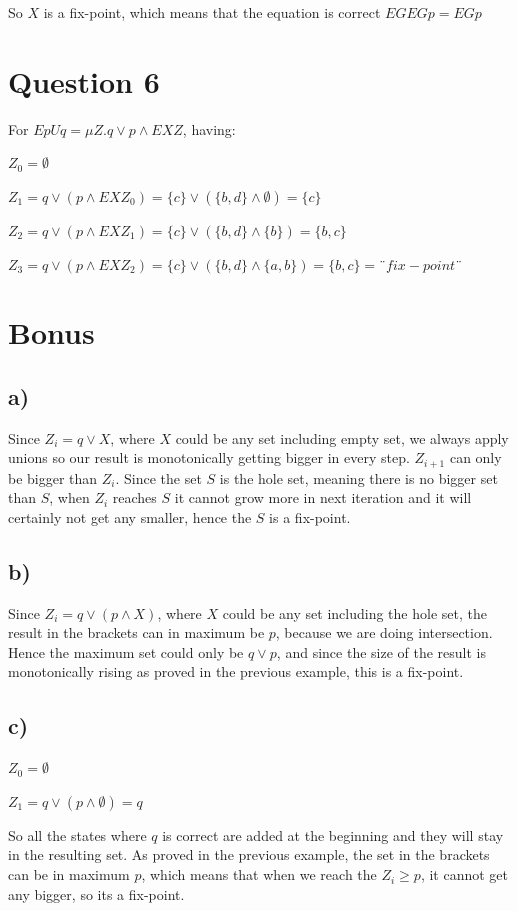 \documentclass[a4paper]{article}
\begin{document}
So $X$ is a fix-point, which means that the equation is correct $EG EG p = EG p$

 
\section{Question 6}

For $E p U q= \mu Z. q \lor p \land EX Z $, having:

$Z_0=\emptyset $

$Z_1=q \lor (p \land EX Z_0)=\{c\} \lor (\{ b, d \} \land \emptyset)=\{c\} $

$Z_2=q \lor (p \land EX Z_1)=\{c\} \lor (\{b, d\} \land \{b\})=\{b,c\} $

$Z_3=q \lor (p \land EX Z_2)=\{c\} \lor (\{b, d\} \land \{a, b\})=\{b,c\}=¨fix-point¨   $

\section{Bonus}

\subsection*{a)}

Since $Z_i = q \lor X$, where $X$ could be any set including empty set, we always apply unions so our result is monotonically getting bigger in every step. $Z_{i+1}$ can only be bigger than $Z_i$. Since the set $S$ is the hole set, meaning there is no bigger set than $S$, when $Z_i$ reaches $S$ it cannot grow more in next iteration and it will certainly not get any smaller, hence the $S$ is a fix-point.

\subsection*{b)}

Since $Z_i=q \lor (p \land X)$, where $X$ could be any set including the hole set, the result in the brackets can in maximum be $p$, because we are doing intersection. Hence the maximum set could only be $q \lor p$, and since the size of the result is monotonically rising as proved in the previous example, this is a fix-point. 

\subsection*{c)}

$Z_0=\emptyset$

$Z_1=q \lor ( p \land \emptyset )=q$

So all the states where $q$ is correct are added at the beginning and they will stay in the resulting set. As proved in the previous example, the set in the brackets can be in maximum $p$, which means that when we reach the $Z_i \geq p$, it cannot get any bigger, so its a fix-point.
\end{document}
